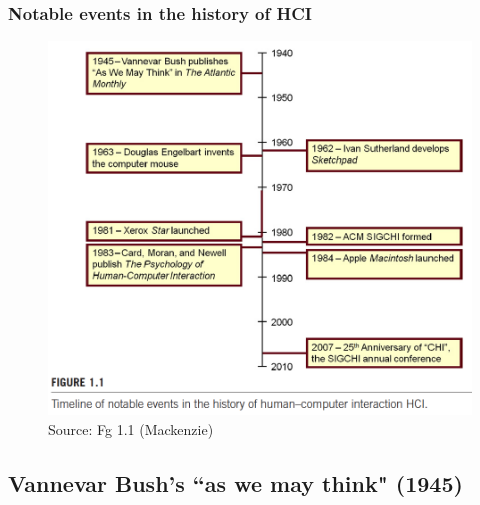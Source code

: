 \documentclass{beamer}
\begin{document}
\begin{frame}
\frametitle{Notable events in the history of HCI}
	\begin{figure}
	\includegraphics[width=0.6\linewidth]{timeline}
	\caption{Source: Fg 1.1 (Mackenzie)}
\end{figure}

\end{frame}

\subsection{Vannevar Bush's ``as we may think" (1945)} %
\end{document}
